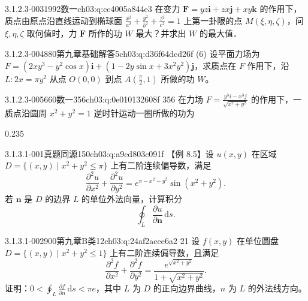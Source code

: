 \begin{q}{3.1.2.3-003}{1992数一}{ch03:q:cc4005a844e3}
在变力 $\mathbf{F}=yz\mathbf{i}+zx\mathbf{j}+xy\mathbf{k}$ 的作用下，质点由原点沿直线运动到椭球面 $\frac{x^2}{a^2}+\frac{y^2}{b^2}+\frac{z^2}{c^2}=1$ 上第一卦限的点 $M(\xi,\eta,\zeta)$，问 $\xi,\eta,\zeta$ 取何值时，力 $\mathbf{F}$ 所作的功 $W$ 最大？并求出 $W$ 的最大值．
\end{q}

\begin{q}{3.1.2.3-004}{880第九章基础解答5}{ch03:q:d36f64dcd26f}
(6) 设平面力场为 $F=(2xy^3-y^2\cos x)\boldsymbol{i}+(1-2y\sin x+3x^2y^2)\boldsymbol{j}$，求质点在 $F$ 作用下，沿 $L:2x=\pi y^2$ 从点 $O(0,0)$ 到点 $A\left(\frac{\pi}{2},1\right)$ 所做的功 $W$。
\end{q}

\begin{q}{3.1.2.3-005}{660数一356}{ch03:q:0e010132608f}
356 在力场 $F=\frac{y^3 i-x^3 j}{\sqrt{x^2+y^2}}$ 的作用下，一质点沿圆周 $x^2+y^2=1$ 逆时针运动一圈所做的功为
\begin{opts}{0.235}
\hfill{}\hfill{}\hfill{}
\end{opts}
\end{q}

\par\addvspace{2.4ex}\noindent
\begin{minipage}{\linewidth}


\begin{q}{3.1.3.1-001}{真题同源150}{ch03:q:a9cd803c091f}
【例 8.5】设 $u(x,y)$ 在区域 $D=\{(x,y)\mid x^2+y^2\le \pi\}$ 上有二阶连续偏导数，满足
\[
\frac{\partial^2 u}{\partial x^2}+\frac{\partial^2 u}{\partial y^2}
= e^{\pi-x^2-y^2}\sin(x^2+y^2).
\]
若 $\boldsymbol{n}$ 是 $D$ 的边界 $L$ 的单位外法向量，计算积分
\[
\oint_L \frac{\partial u}{\partial \boldsymbol{n}}\,\mathrm{d}s.
\]
\end{q}
\end{minipage}


\begin{q}{3.1.3.1-002}{900第九章B类12}{ch03:q:24af2acee6a2}
21 设 $f(x,y)$ 在单位圆盘 $D=\{(x,y)\mid x^2+y^2\le 1\}$ 上有二阶连续偏导数，且满足
\[
\frac{\partial^2 f}{\partial x^2}+\frac{\partial^2 f}{\partial y^2}=\frac{e^{\sqrt{x^2+y^2}}}{1+\sqrt{x^2+y^2}}.
\]
证明：$\displaystyle 0<\oint_L \frac{\partial f}{\partial n}\,\mathrm{d}s<\pi e$，其中 $L$ 为 $D$ 的正向边界曲线，$n$ 为 $L$ 的外法线方向。
\end{q}

